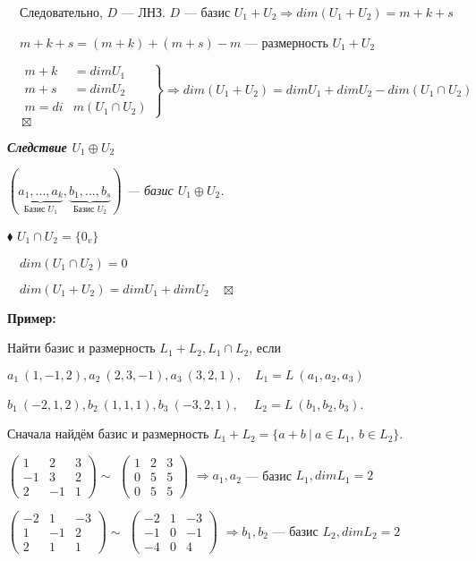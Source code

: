 \documentclass[a4paper, 12pt]{report}
\begin{document}
	$\quad$Следовательно, $D$ --- ЛНЗ. $D$ --- базис $U_1+U_2\Rightarrow dim(U_1 + U_2) = m + k + s$
	
	$\quad m+k+s = (m+k)+(m+s)-m$ --- размерность $U_1 + U_2$
	
	$\quad\left.
	\begin{aligned}
		m+k &= dim U_1 \\
		m+s &= dim U_2 \\
		m = di&m (U_1\cap U_2)
	\end{aligned}
	\right\}
	\Rightarrow dim(U_1 + U_2) = dim U_1 + dim U_2 - dim(U_1\cap U_2)
	$
	$\quad \boxtimes$
	\par\bigskip
	\textbf{\textit{Следствие $U_1 \oplus U_2$}}
	
	\textit{
		$(\underbrace{a_1,...,a_k}_{\text{Базис } U_1}, \underbrace{b_1,...,b_s}_{\text{Базис } U_2})$ --- базис $U_1\oplus U_2$.}
	\par\bigskip
	$\blacklozenge$ $U_1\cap U_2 = \{0_v\}$
	
	$\quad dim(U_1\cap U_2)=0$
	
	$\quad dim(U_1 + U_2) = dim U_1 + dim U_2\quad \boxtimes$
	\par\bigskip
	\textbf{Пример:}
	
	Найти базис и размерность $L_1 + L_2, L_1\cap L_2$, если
	
	$a_1\ (1,-1,2), a_2\ (2,3,-1), a_3\ (3,2,1), \quad L_1 = L\ (a_1,a_2,a_3)$
	
	$b_1\ (-2,1,2), b_2\ (1,1,1), b_3\ (-3,2,1), \quad \  L_2 = L\ (b_1,b_2,b_3)$.
	\par\bigskip
	Сначала найдём базис и размерность $L_1+L_2 = \{a+b\ |\ a\in L_1,\ b\in L_2\}$.
	\par\bigskip
	$\begin{pmatrix} 1 & 2 & 3 \\ -1 & 3 & 2 \\ 2 & -1 & 1 \end{pmatrix} \sim $
	$\begin{pmatrix} 1 & 2 & 3 \\ 0  & 5 & 5  \\   0 & 5 & 5 \end{pmatrix}$ $\Rightarrow a_1, a_2$ --- базис $L_1, dim L_1 = 2$
	
	$\begin{pmatrix} -2 & 1& -3 \\ 1 & -1 & 2 \\ 2 & 1 & 1 \end{pmatrix} \sim $
	$\begin{pmatrix} -2 & 1 & -3 \\ -1  & 0 & -1  \\   -4 & 0 & 4 \end{pmatrix}$ $\Rightarrow b_1, b_2$ --- базис $L_2, dim L_2 = 2$
	
\end{document}
